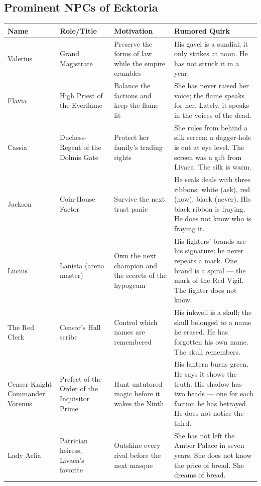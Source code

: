 \subsection*{Prominent NPCs of Ecktoria}
\begin{longtable}{|p{}|p{}|p{}|p{}|}
\hline
\textbf{Name} & \textbf{Role/Title} & \textbf{Motivation} & \textbf{Rumored Quirk} \\
\hline
Valerius & Grand Magistrate & Preserve the forms of law while the empire crumbles & His gavel is a sundial; it only strikes at noon. He has not struck it in a year. \\
\hline
Flavia & High Priest of the Everflame & Balance the factions and keep the flame lit & She has never raised her voice; the flame speaks for her. Lately, it speaks in the voices of the dead. \\
\hline
Cassia & Duchess-Regent of the Dolmis Gate & Protect her family's trading rights & She rules from behind a silk screen; a dagger-hole is cut at eye level. The screen was a gift from Livaea. The silk is warm. \\
\hline
Jackson & Coin-House Factor & Survive the next trust panic & He seals deals with three ribbons: white (ask), red (now), black (never). His black ribbon is fraying. He does not know who is fraying it. \\
\hline
Lucius & Lanista (arena master) & Own the next champion and the secrets of the hypogeum & His fighters' brands are his signature; he never repeats a mark. One brand is a spiral --- the mark of the Red Vigil. The fighter does not know. \\
\hline
The Red Clerk & Censor's Hall scribe & Control which names are remembered & His inkwell is a skull; the skull belonged to a name he erased. He has forgotten his own name. The skull remembers. \\
\hline
Censer-Knight Commander Vorenus & Prefect of the Order of the Inquisitor Prime & Hunt untutored magic before it wakes the Ninth & His lantern burns green. He says it shows the truth. His shadow has two heads --- one for each faction he has betrayed. He does not notice the third. \\
\hline
Lady Aelia & Patrician heiress, Livaea's favorite & Outshine every rival before the next masque & She has not left the Amber Palace in seven years. She does not know the price of bread. She dreams of bread. \\
\hline
\end{longtable}

